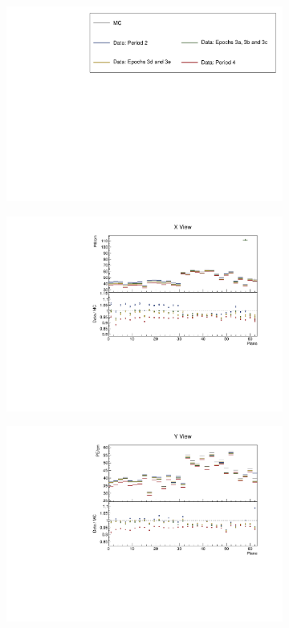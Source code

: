 \documentclass[12pt,a4paper]{article}
\begin{document}
\begin{figure}[h!]
  \begin{subfigure}{\textwidth}
  \centering
    \includegraphics[height=0.2\linewidth]{essentialsec_tb/legend.pdf}
  \end{subfigure}
  \vspace*{2mm}

  \begin{subfigure}{0.5\textwidth}
    \includegraphics[width=\linewidth]{essentialsec_tb/pecm_plane_x.pdf}
  \end{subfigure}
  \begin{subfigure}{0.5\textwidth}
    \includegraphics[width=\linewidth]{essentialsec_tb/pecm_plane_y.pdf}

\end{subfigure}
\end{figure}
\end{document}
